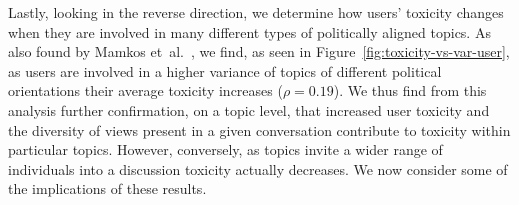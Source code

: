 Lastly, looking in the reverse direction, we determine how users' toxicity changes when they are involved in many different types of politically aligned topics.  As also found by Mamkos et~al.~\cite{mamakos2023social}, we find, as seen in Figure~\ref{fig:toxicity-vs-var-user},  as users are involved in a higher variance of topics of different political orientations their average toxicity increases ($\rho=0.19$). We thus find from this analysis further confirmation, on a topic level, that increased user toxicity and the diversity of views present in a given conversation contribute to toxicity within particular topics. However, conversely, as topics invite a wider range of individuals into a discussion toxicity actually decreases. We now consider some of the implications of these results. 









